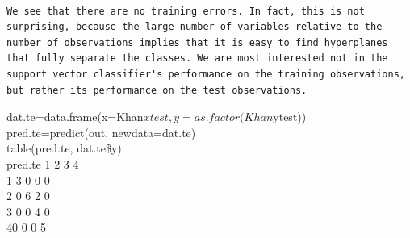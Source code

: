 \documentclass[10pt]{article}
\begin{document}
\begin{verbatim}

We see that there are no training errors. In fact, this is not surprising, because the large number of variables relative to the number of observations implies that it is easy to find hyperplanes that fully separate the classes. We are most interested not in the support vector classifier's performance on the training observations, but rather its performance on the test observations.
\end{verbatim}

\begin{displayquote}
dat.te=data.frame(x=Khan$xtest, y=as.factor(Khan$ytest))\\
pred.te=predict(out, newdata=dat.te)\\
table(pred.te, dat.te\$y)\\
pred.te 1 2 3 4\\
1 3 0 0 0\\
2 0 6 2 0\\
3 0 0 4 0\\
40 0 0 5
\end{displayquote}
\end{document}
